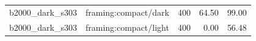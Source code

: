 \begin{longtable}{l>{\raggedright\arraybackslash}p{.42\linewidth}rrr}
b2000\_\allowbreak{}dark\_\allowbreak{}s303 & %
framing:compact/dark & %
400 & %
64.50 & %
99.00 \\ %

b2000\_\allowbreak{}dark\_\allowbreak{}s303 & %
framing:compact/light & %
400 & %
0.00 & %
56.48 \\ %


\end{longtable}
